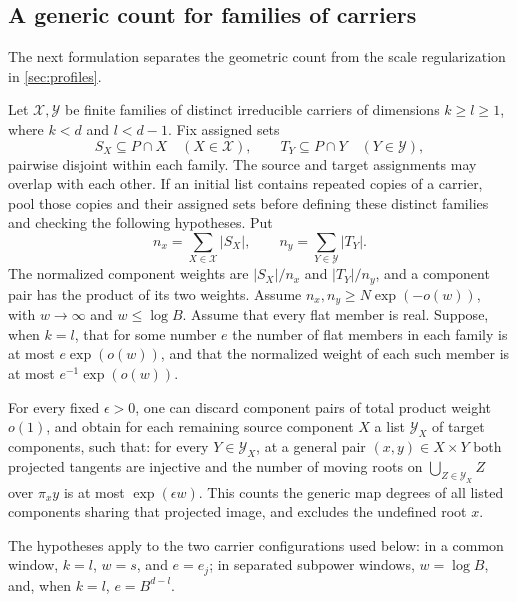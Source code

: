 \subsection{A generic count for families of carriers}

The next formulation separates the geometric count from the scale regularization in \cref{sec:profiles}.

\begin{lemma}\label{lem:geo-generic-depth}
Let $\mathcal{X},\mathcal{Y}$ be finite families of distinct irreducible carriers of dimensions $k\ge l\ge1$, where $k<d$ and $l<d-1$. Fix assigned sets
\[
 S_X\subseteq P\cap X\quad(X\in\mathcal{X}),\qquad
 T_Y\subseteq P\cap Y\quad(Y\in\mathcal{Y}),
\]
pairwise disjoint within each family.  The source and target assignments may overlap with each other.  If an initial list contains repeated copies of a carrier, pool those copies and their assigned sets before defining these distinct families and checking the following hypotheses.  Put
\[
 n_x=\sum_{X\in\mathcal{X}}|S_X|,\qquad
 n_y=\sum_{Y\in\mathcal{Y}}|T_Y|.
\]
The normalized component weights are $|S_X|/n_x$ and $|T_Y|/n_y$, and a component pair has the product of its two weights. Assume $n_x,n_y\ge N\exp(-o(w))$, with $w\to\infty$ and $w\le\log B$.  Assume that every flat member is real. Suppose, when $k=l$, that for some number $e$ the number of flat members in each family is at most $e\exp(o(w))$, and that the normalized weight of each such member is at most $e^{-1}\exp(o(w))$.

For every fixed $\epsilon>0$, one can discard component pairs of total product weight $o(1)$, and obtain for each remaining source component $X$ a list $\mathcal{Y}_X$ of target components, such that: for every $Y\in\mathcal{Y}_X$, at a general pair $(x,y)\in X\times Y$ both projected tangents are injective and the number of moving roots on $\bigcup_{Z\in\mathcal{Y}_X}Z$ over $\pi_xy$ is at most $\exp(\epsilon w)$. This counts the generic map degrees of all listed components sharing that projected image, and excludes the undefined root $x$.

The hypotheses apply to the two carrier configurations used below: in a common window, $k=l$, $w=s$, and $e=e_j$; in separated subpower windows, $w=\log B$, and, when $k=l$, $e=B^{d-l}$.
\end{lemma}

